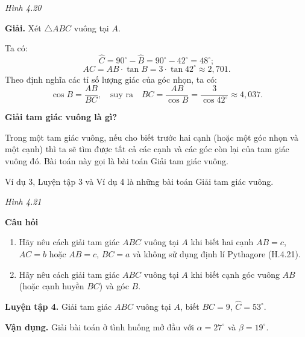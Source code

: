 \begin{lesson}
\begin{center}
        \textit{Hình 4.20}
    \end{center}

    \textbf{Giải.} Xét $\triangle ABC$ vuông tại $A$.

    Ta có:
    \[
        \widehat{C}=90^\circ-\widehat{B}=90^\circ-42^\circ=48^\circ;
    \]
    \[
        AC=AB\cdot\tan B=3\cdot\tan42^\circ\approx2{,}701.
    \]
    Theo định nghĩa các tỉ số lượng giác của góc nhọn, ta có:
    \[
        \cos B=\dfrac{AB}{BC},\quad\text{suy ra}\quad BC=\dfrac{AB}{\cos B}=\dfrac{3}{\cos42^\circ}\approx4{,}037.
    \]

    \textbf{Giải tam giác vuông là gì?}

    Trong một tam giác vuông, nếu cho biết trước hai cạnh (hoặc một góc nhọn và một cạnh) thì ta sẽ tìm được tất cả các cạnh và các góc còn lại của tam giác vuông đó. Bài toán này gọi là bài toán Giải tam giác vuông.

    Ví dụ 3, Luyện tập 3 và Ví dụ 4 là những bài toán Giải tam giác vuông.

    \begin{center}

        \textit{Hình 4.21}
    \end{center}

    \textbf{Câu hỏi}
    \begin{enumerate}[label=\arabic*.]
        \item Hãy nêu cách giải tam giác $ABC$ vuông tại $A$ khi biết hai cạnh $AB=c$, $AC=b$ hoặc $AB=c$, $BC=a$ và không sử dụng định lí Pythagore (H.4.21).

        \answerline
        \answerline
        \answerline
        \item Hãy nêu cách giải tam giác $ABC$ vuông tại $A$ khi biết cạnh góc vuông $AB$ (hoặc cạnh huyền $BC$) và góc $B$.

        \answerline
        \answerline
        \answerline
    \end{enumerate}

    \textbf{Luyện tập 4.} Giải tam giác $ABC$ vuông tại $A$, biết $BC=9$, $\widehat{C}=53^\circ$.

    \answerline
    \answerline
    \answerline

    \textbf{Vận dụng.} Giải bài toán ở tình huống mở đầu với $\alpha=27^\circ$ và $\beta=19^\circ$.

    \answerline
    \answerline
    \answerline
\end{lesson}

